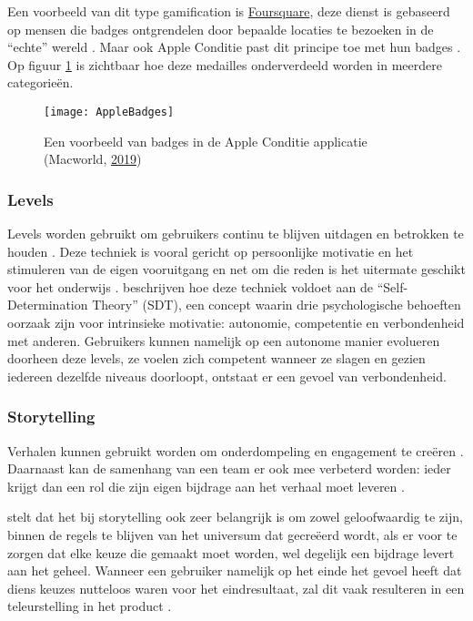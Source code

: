 Een voorbeeld van dit type gamification is \href{https://foursquare.com/}{Foursquare}, deze dienst is gebaseerd op mensen die badges ontgrendelen door bepaalde locaties te bezoeken in de ``echte'' wereld \autocite{Hamari2011}. Maar ook Apple Conditie past dit principe toe met hun badges \autocite{Ha2020}. Op figuur \ref{fig:apple_badges} is zichtbaar hoe deze medailles onderverdeeld worden in meerdere categorieën.

\begin{figure}[h]
    \caption[Badges in de Apple Conditie applicatie]{Een voorbeeld van badges in de Apple Conditie applicatie (Macworld, \href{https://www.macworld.com/article/231140/how-to-get-all-of-the-apple-watch-activity-challenge-badges.html}{2019})}
    \texttt{[image: AppleBadges]}
    \label{fig:apple_badges}
\end{figure}

\subsubsection{Levels}
Levels worden gebruikt om gebruikers continu te blijven uitdagen en betrokken te houden \autocite{Dong2012}. Deze techniek is vooral gericht op persoonlijke motivatie en het stimuleren van de eigen vooruitgang en net om die reden is het uitermate geschikt voor het onderwijs \autocite{ManzanoLeon2021}.
\textcite{ManzanoLeon2021} beschrijven hoe deze techniek voldoet aan de ``Self-Determination Theory'' (SDT), een concept waarin drie psychologische behoeften oorzaak zijn voor intrinsieke motivatie: autonomie, competentie en verbondenheid met anderen. Gebruikers kunnen namelijk op een autonome manier evolueren doorheen deze levels, ze voelen zich competent wanneer ze slagen en gezien iedereen dezelfde niveaus doorloopt, ontstaat er een gevoel van verbondenheid.

\subsubsection{Storytelling}
Verhalen kunnen gebruikt worden om onderdompeling en engagement te creëren \autocite{ManzanoLeon2021}. Daarnaast kan de samenhang van een team er ook mee verbeterd worden: ieder krijgt dan een rol die zijn eigen bijdrage aan het verhaal moet leveren \autocite{ManzanoLeon2021}.

\textcite{Marczewski2015} stelt dat het bij storytelling ook zeer belangrijk is om zowel geloofwaardig te zijn, binnen de regels te blijven van het universum dat gecreëerd wordt, als er voor te zorgen dat elke keuze die gemaakt moet worden, wel degelijk een bijdrage levert aan het geheel. Wanneer een gebruiker namelijk op het einde het gevoel heeft dat diens keuzes nutteloos waren voor het eindresultaat, zal dit vaak resulteren in een teleurstelling in het product \autocite{Marczewski2015}.

